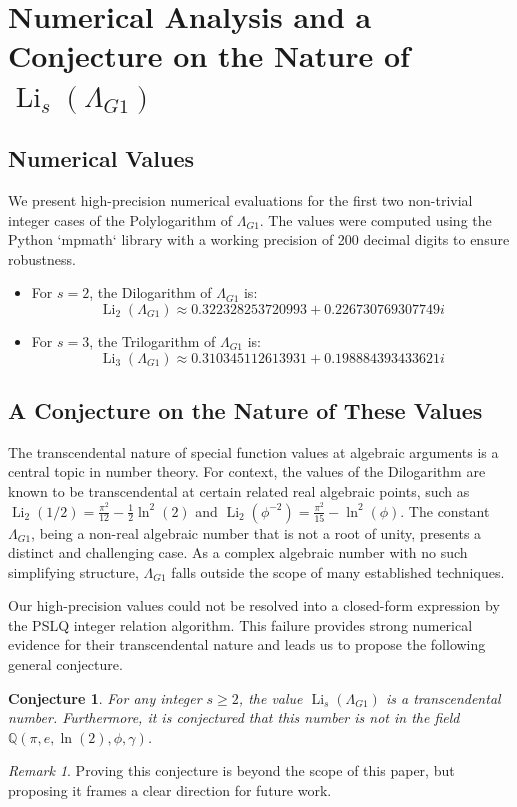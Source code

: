\documentclass{amsart}
\theoremstyle{plain}
\newtheorem{conjecture}[theorem]{Conjecture}
\theoremstyle{definition}
\theoremstyle{remark}
\newtheorem*{remark}{Remark}
\DeclareMathOperator{\Li}{Li} %
\newcommand{\LambdaG}{\Lambda_{G1}}
\begin{document}
\section{Numerical Analysis and a Conjecture on the Nature of \texorpdfstring{$\Li_s(\LambdaG)$}{Li\_s(Lambda\_G1)}}

\subsection{Numerical Values}
We present high-precision numerical evaluations for the first two non-trivial integer cases of the Polylogarithm of $\LambdaG$. The values were computed using the Python `mpmath` library with a working precision of 200 decimal digits to ensure robustness.
\begin{itemize}
    \item For $s=2$, the Dilogarithm of $\LambdaG$ is:
    $$ \Li_2(\LambdaG) \approx 0.322328253720993 + 0.226730769307749i $$
    
    \item For $s=3$, the Trilogarithm of $\LambdaG$ is:
    $$ \Li_3(\LambdaG) \approx 0.310345112613931 + 0.198884393433621i $$
\end{itemize}

\subsection{A Conjecture on the Nature of These Values}
The transcendental nature of special function values at algebraic arguments is a central topic in number theory. For context, the values of the Dilogarithm are known to be transcendental at certain related real algebraic points, such as $\Li_2(1/2) = \frac{\pi^2}{12} - \frac{1}{2}\ln^2(2)$ and $\Li_2(\phi^{-2}) = \frac{\pi^2}{15} - \ln^2(\phi)$. The constant $\LambdaG$, being a non-real algebraic number that is not a root of unity, presents a distinct and challenging case. As a complex algebraic number with no such simplifying structure, $\LambdaG$ falls outside the scope of many established techniques.

Our high-precision values could not be resolved into a closed-form expression by the PSLQ integer relation algorithm. This failure provides strong numerical evidence for their transcendental nature and leads us to propose the following general conjecture.

\begin{conjecture}
For any integer $s \ge 2$, the value $\Li_s(\LambdaG)$ is a transcendental number. Furthermore, it is conjectured that this number is not in the field $\mathbb{Q}(\pi, e, \ln(2), \phi, \gamma)$.
\end{conjecture}
\begin{remark}
Proving this conjecture is beyond the scope of this paper, but proposing it frames a clear direction for future work.
\end{remark}
\end{document}
